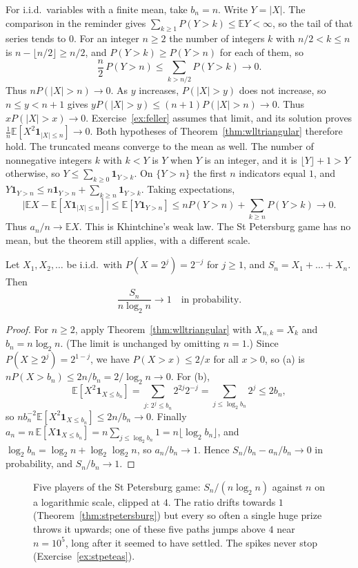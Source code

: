 For i.i.d.\ variables with a finite mean, take $b_n=n$. Write $Y=|X|$. The comparison in the reminder gives $\sum_{k\ge1}P(Y>k)\le\mathbb EY<\infty$, so the tail of that series tends to $0$. For an integer $n\ge2$ the number of integers $k$ with $n/2<k\le n$ is $n-\lfloor n/2\rfloor\ge n/2$, and $P(Y>k)\ge P(Y>n)$ for each of them, so
\[
\frac n2\,P(Y>n)\le\sum_{k>n/2}P(Y>k)\to0.
\]
Thus $nP(|X|>n)\to0$. As $y$ increases, $P(|X|>y)$ does not increase, so $n\le y<n+1$ gives $yP(|X|>y)\le(n+1)P(|X|>n)\to0$. Thus $xP(|X|>x)\to0$. Exercise~\ref{ex:feller} assumes that limit, and its solution proves $\frac1n\mathbb E[X^2\mathbf 1_{|X|\le n}]\to0$. Both hypotheses of Theorem~\ref{thm:wlltriangular} therefore hold. The truncated means converge to the mean as well. The number of nonnegative integers $k$ with $k<Y$ is $Y$ when $Y$ is an integer, and it is $\lfloor Y\rfloor+1>Y$ otherwise, so $Y\le\sum_{k\ge0}\mathbf 1_{Y>k}$. On $\{Y>n\}$ the first $n$ indicators equal $1$, and $Y\mathbf 1_{Y>n}\le n\mathbf 1_{Y>n}+\sum_{k\ge n}\mathbf 1_{Y>k}$. Taking expectations,
\[
\bigl|\mathbb EX-\mathbb E[X\mathbf 1_{|X|\le n}]\bigr|\le\mathbb E[Y\mathbf 1_{Y>n}]\le nP(Y>n)+\sum_{k\ge n}P(Y>k)\to0.
\]
Thus $a_n/n\to\mathbb EX$. This is Khintchine's weak law. The
St Petersburg game has no mean, but the theorem still applies, with a different scale.

\begin{theorem}[Feller, 1945]\label{thm:stpetersburg}
Let $X_1,X_2,\dots$ be i.i.d.\ with $P(X=2^j)=2^{-j}$ for $j\ge1$, and $S_n=X_1+\dots+X_n$. Then
\[
\frac{S_n}{n\log_2n}\to1\quad\text{in probability.}
\]
\end{theorem}
\begin{proof}
For $n\ge2$, apply Theorem~\ref{thm:wlltriangular} with $X_{n,k}=X_k$ and $b_n=n\log_2n$. (The limit is unchanged by omitting $n=1$.) Since $P(X\ge2^j)=2^{1-j}$, we have $P(X>x)\le2/x$ for all
$x>0$, so (a) is $nP(X>b_n)\le2n/b_n=2/\log_2n\to0$. For (b),
\[
\mathbb E[X^2\mathbf 1_{X\le b_n}]=\sum_{j:\,2^j\le b_n}2^{2j}2^{-j}=\sum_{j\le\log_2b_n}2^j\le2b_n,
\]
so $nb_n^{-2}\mathbb E[X^2\mathbf 1_{X\le b_n}]\le2n/b_n\to0$. Finally $a_n=n\,\mathbb E[X\mathbf 1_{X\le b_n}]=n\sum_{j\le\log_2b_n}1=n\lfloor\log_2b_n\rfloor$,
and $\log_2b_n=\log_2n+\log_2\log_2n$, so $a_n/b_n\to1$. Hence $S_n/b_n-a_n/b_n\to0$ in probability, and $S_n/b_n\to1$.
\end{proof}

\begin{figure}[ht]
\centering{}
\caption{Five players of the St Petersburg game: $S_n/(n\log_2n)$ against $n$ on a logarithmic scale, clipped at $4$. The ratio drifts towards $1$
(Theorem~\ref{thm:stpetersburg}) but every so often a single huge prize throws it upwards; one of these five paths jumps above $4$ near
$n=10^5$, long after it seemed to have settled. The spikes never stop (Exercise~\ref{ex:stpeteas}).}
\label{fig:petersburg}
\end{figure}

